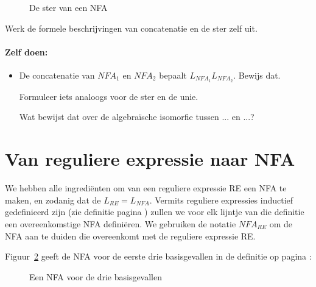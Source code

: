\begin{figure}[h]
\caption{De ster van een NFA\label{starfsa}}
\end{figure}


Werk de formele beschrijvingen van concatenatie en de ster zelf uit.

\paragraph{Zelf doen:}
\begin{itemize}
\item[]
De concatenatie van $NFA_1$ en $NFA_2$ bepaalt
$L_{NFA_1}L_{NFA_2}$. Bewijs dat.

Formuleer iets analoogs voor de ster
en de unie.

Wat bewijst dat over de algebra\"{i}sche isomorfie tussen ... en ...?
\end{itemize}

\clearpage

\section{Van reguliere expressie naar NFA}\label{re2fsasec}

We hebben alle ingredi\"enten om van een reguliere expressie RE een NFA te
maken, en zodanig dat de $L_{RE} = L_{NFA}$. Vermits reguliere
expressies inductief gedefinieerd zijn (zie definitie pagina
\pageref{defregexp}) zullen we voor elk lijntje van die definitie een
overeenkomstige NFA defini\"eren. We gebruiken de notatie $NFA_{RE}$ om
de NFA aan te duiden die overeenkomt met de reguliere expressie RE.

Figuur~\ref{re2fsa} geeft de NFA voor de eerste drie basisgevallen in
de definitie op pagina \pageref{defregexp}:

\begin{figure}[h]
\caption{Een NFA voor de drie basisgevallen\label{re2fsa}}
\end{figure}

